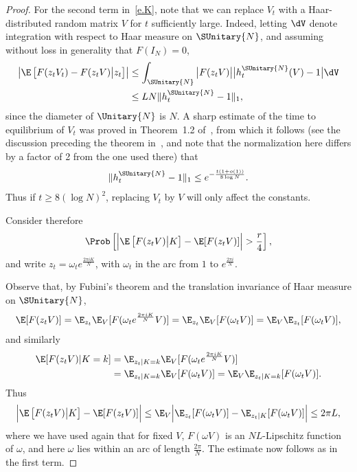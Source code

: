 \begin{proof}
For the second term in~\eqref{e.K}, note that we can replace $V_t$ with a Haar-distributed random matrix $V$ for $t$ sufficiently large. Indeed, letting $\dV$ denote integration with respect to Haar measure on $\SUnitary{N}$, and assuming without loss in generality that $F(I_N)=0$,
\begin{equation}\label{eC}
\begin{split}
\left|\E\left[F(z_tV_t)-F(z_tV)\big|z_t\right]\right|&\le\int_{\SUnitary{N}}\big|F(z_tV)\big|\big|h^{\SUnitary{N}}_t(V)-1\big|\dV\\&\le LN\|h^{\SUnitary{N}}_t-1\|_1,
\end{split}
\end{equation}
since the diameter of $\Unitary{N}$ is $N$. A sharp estimate of the time to equilibrium of $V_t$ was proved in Theorem~1.2 of~\cite{SC1994b}, from which it follows (see the discussion preceding the theorem in~\cite{SC1994b}, and note that the normalization here differs by a factor of 2 from the one used there) that
\begin{equation}\label{eD}
\|h^{\SUnitary{N}}_t-1\|_1\le e^{-\frac{t(1+o(1))}{8\log N}}.
\end{equation}
Thus if $t\ge8(\log N)^2$, replacing $V_t$ by $V$ will only affect the constants.

Consider therefore
\[
\Prob\left[\Big|\E\left[F(z_tV)\big|K\right]-\E[F(z_tV)]\Big|>\frac{r}{4}\right],
\]
and write $z_t=\omega_te^{\frac{2\pi i K}{N}}$, with $\omega_t$ in the arc from $1$ to $e^{\frac{2\pi i}{N}}$.

Observe that, by Fubini's theorem and the translation invariance of Haar measure on $\SUnitary{N}$,
\[
\E[F(z_tV)]=\E_{z_t}\E_V[F(\omega_te^{\frac{2\pi i K}{N}}V)]=\E_{z_t}\E_V[F(\omega_tV)]=\E_V\E_{z_t}[F(\omega_tV)],
\]
and similarly
\begin{align*}
\E[F(z_tV)|K=k] &=\E_{z_t|K=k}\E_V[F(\omega_te^{\frac{2\pi i K}{N}}V)] \\
&=\E_{z_t|K=k}\E_V[F(\omega_tV)] =\E_V \E_{z_t|K=k}[F(\omega_tV)].
\end{align*}
Thus
\[
\Big|\E\left[F(z_tV)\big|K\right]-\E[F(z_tV)]\Big|\le\E_V\Big|\E_{z_t}[F(\omega_tV)]-\E_{z_t|K}[F(\omega_tV)]\Big|\le2\pi L,
\]
where we have used again that for fixed $V$, $F(\omega V)$ is an $NL$-Lipschitz function of $\omega$, and here $\omega$ lies within an arc of length $\frac{2\pi}{N}$. The estimate now follows as in the first term.
\end{proof}



